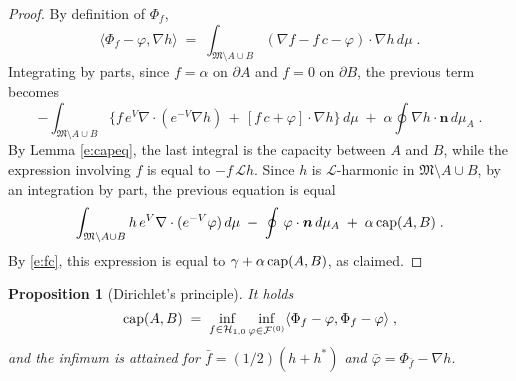\documentclass[reqno]{amsart}
\newtheorem{proposition}[theorem]{Proposition}
\newcounter{as}[section]
\newcommand{\mc}[1]{{\mathcal #1}}
\newcommand{\mf}[1]{{\mathfrak #1}}
\newcommand{\bs}[1]{{\boldsymbol #1}}
\newcommand{\<}{\langle}
\renewcommand{\>}{\rangle}
\renewcommand{\Cap}{{\rm cap}}
\begin{document}
\begin{proof}
By definition of $\Phi_f$,
\begin{equation*}
\langle \Phi_f-\varphi,\nabla h\rangle \;=\;
\int_{\mf M\setminus A\cup B} \left(\nabla f
-f\,c-\varphi\right)\cdot \nabla h\, d\mu \;.
\end{equation*}
Integrating by parts, since $f=\alpha$ on $\partial A$ and $f=0$ on
$\partial B$, the previous term becomes
\begin{equation*}
- \int_{\mf M\setminus A\cup B}  \Big\{ f\,e^{V} \nabla \cdot
\left(e^{-V}\nabla h\right) \,+\, [ f\,c + \varphi] \cdot \nabla h
  \Big\} \, d\mu
\;+\; \alpha \oint \nabla h \cdot \bs n\, d\mu_A \;.
\end{equation*}
By Lemma \ref{e:capeq}, the last integral is the capacity between $A$
and $B$, while the expression involving $f$ is equal to $- f\, \mc L
h$. Since $h$ is $\mc L$-harmonic in $\mf M\setminus A\cup B$, by an
integration by part, the previous equation is equal
\begin{equation*}
\int_{\mf M\setminus A\cup B} h \, e^V \nabla \cdot (e^{-V}\varphi) \, d\mu
\;-\; \oint \, \varphi \cdot \bs n \, d\mu_A
\;+\; \alpha\,\Cap(A,B) \;.
\end{equation*}
By \eqref{e:fc}, this expression is equal to $\gamma +
\alpha\,\Cap(A,B)$, as claimed.
\end{proof}
\begin{proposition}[Dirichlet's principle]
\label{p:dirich}
It holds
\begin{equation}
\label{e:dirich}
\Cap(A,B)\;=\; \inf_{f\in \mc H_{1,0}}\inf_{\varphi \in \mc F^{(0)}}
\langle \Phi_f-\varphi,\Phi_f-\varphi\rangle\;,
\end{equation}
and the infimum is attained for $\bar f=(1/2) (h+h^*)$ and $\bar
\varphi=\Phi_{\bar f}-\nabla h$.
\end{proposition}
\end{document}

